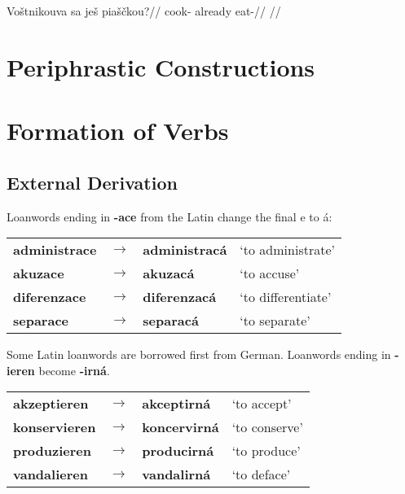 \pex
\begingl
\gla Vo\v{s}tnikouva sa je\v{s} pia\v{s}\v{c}kou?//
\glb cook- already  eat-//
\glft {}//
\endgl
\xe

\section{Periphrastic Constructions}

\section{Formation of Verbs}
\subsection{External Derivation}
\par Loanwords ending in \textbf{-ace} from the Latin change the final e to á:
\begin{table}[h!]
	\centering \small
	\begin{tabu} to 0.9
		administrace 	& $\rightarrow$ & administracá 	& `to administrate' \\
		akuzace			& $\rightarrow$ & akuzacá		& `to accuse'\\
		diferenzace		& $\rightarrow$ & diferenzacá	& `to differentiate'\\
		separace		& $\rightarrow$ & separacá		& `to separate'\\
	\end{tabu}
\end{table}
\par Some Latin loanwords are borrowed first from German. Loanwords ending in \textbf{-ieren} become \textbf{-irná}.
\begin{table}[h!]
	\centering \small
	\begin{tabu} to 0.9
		akzeptieren 	& $\rightarrow$ & akceptirná 	& `to accept' \\
		konservieren	& $\rightarrow$ & koncervirná	& `to conserve'\\
		produzieren		& $\rightarrow$ & producirná	& `to produce'\\
		vandalieren		& $\rightarrow$ & vandalirná 	& `to deface'\\
	\end{tabu}
\end{table}
